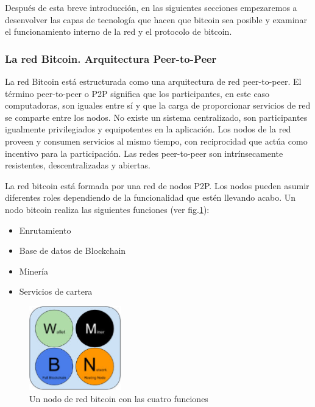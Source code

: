 \noindent Después de esta breve introducción, en las siguientes secciones empezaremos a desenvolver las capas de 
tecnología que hacen que bitcoin sea posible y examinar el funcionamiento interno de la red y el protocolo de bitcoin.

\subsubsection{La red Bitcoin. Arquitectura Peer-to-Peer}

La red Bitcoin está estructurada como una arquitectura de red peer-to-peer. El término peer-to-peer o P2P significa 
que los participantes, en este caso computadoras, son iguales entre sí y que la carga de proporcionar servicios de red 
se comparte entre los nodos. No existe un sistema centralizado, son participantes igualmente privilegiados y 
equipotentes en la aplicación. Los nodos de la red proveen y consumen servicios al mismo tiempo, con reciprocidad que 
actúa como incentivo para la participación. Las redes peer-to-peer son intrínsecamente resistentes, descentralizadas y 
abiertas. 
 
\vspace{5mm}

\noindent La red bitcoin está formada por una red de nodos P2P. Los nodos pueden asumir diferentes roles dependiendo de 
la funcionalidad que estén llevando acabo. Un nodo bitcoin realiza las siguientes funciones (ver fig.\ref{fig:funciones-nodo}): 

\begin{itemize}
    \item Enrutamiento
    \item Base de datos de Blockchain
    \item Minería
    \item Servicios de cartera
\end{itemize}

\begin{figure}
    \centering
    \includegraphics[width=4cm]{imagenes/introduccion/nodo_bitcoin}
    \caption{Un nodo de red bitcoin con las cuatro funciones}
    \label{fig:funciones-nodo}
\end{figure}

